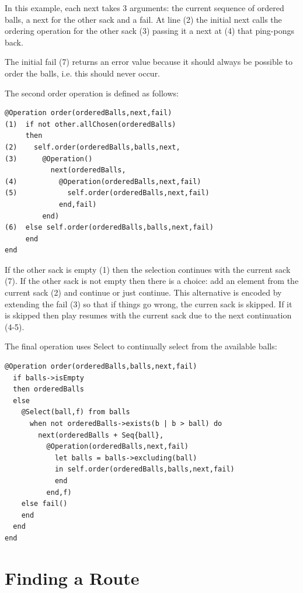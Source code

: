 In this example, each next takes 3 arguments: the current sequence
of ordered balls, a next for the other sack and a fail. At line (2)
the initial next calls the ordering operation for the other sack (3)
passing it a next at (4) that ping-pongs back.

The initial fail (7) returns an error value because it should always
be possible to order the balls, i.e. this should never occur.

The second order operation is defined as follows:

\begin{lstlisting}
@Operation order(orderedBalls,next,fail)
(1)  if not other.allChosen(orderedBalls)
     then 
(2)    self.order(orderedBalls,balls,next,
(3)      @Operation() 
           next(orderedBalls,
(4)          @Operation(orderedBalls,next,fail) 
(5)            self.order(orderedBalls,next,fail) 
             end,fail) 
         end)
(6)  else self.order(orderedBalls,balls,next,fail)
     end
end
\end{lstlisting}If the other sack is empty (1) then the selection continues with the
current sack (7). If the other sack is not empty then there is a choice:
add an element from the current sack (2) and continue or just continue.
This alternative is encoded by extending the fail (3) so that if things
go wrong, the curren sack is skipped. If it is skipped then play resumes
with the current sack due to the next continuation (4-5).

The final operation uses Select to continually select from the available
balls:

\begin{lstlisting}
@Operation order(orderedBalls,balls,next,fail)
  if balls->isEmpty
  then orderedBalls
  else
    @Select(ball,f) from balls 
      when not orderedBalls->exists(b | b > ball) do
        next(orderedBalls + Seq{ball},
          @Operation(orderedBalls,next,fail) 
            let balls = balls->excluding(ball)
            in self.order(orderedBalls,balls,next,fail)
            end
          end,f)
    else fail()
    end
  end
end
\end{lstlisting}
\section{Finding a Route}

